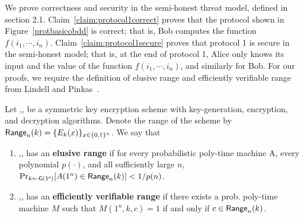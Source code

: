 We prove correctness and security in the semi-honest threat model,
defined in section 2.1.  Claim~\ref{claim:protocol1correct}
proves that the protocol shown in Figure~\ref{protbasicobdd} is
correct; that is, Bob computes the function $f(i_1,\cdots,i_n)$.
Claim~\ref{claim:protocol1secure} proves that protocol 1 is secure
in the semi-honest model; that is, at the end of protocol 1, Alice only
knows its input and the value of the function $f(i_1,\cdots,i_n)$, and
similarly for Bob. For our proofs, we require the definition of elusive range and
efficiently verifiable range from Lindell and Pinkas~\cite{LP04}.
\begin{definition}
Let ,, be a symmetric key encryption scheme
with key-generation, encryption, and decryption algorithms.
Denote the range of the scheme by
$\mathsf{Range}_n(k)=\{E_k(x)\}_{x\in\{0,1\}^n}$. We say that
\begin{enumerate}
	\item {},, has an \textbf{elusive range}
	if for every probabilistic poly-time machine A, every
	polynomial $p(\cdot)$, and all sufficiently large $n$,
	$\Pr_{k{\gets}\mathsf{G(1^n)}}[A(1^n)\in\mathsf{Range}_n(k)]<1/p(n)$.

	\item {},, has an \textbf{efficiently
	verifiable range} if there exists a prob. poly-time
	machine $M$ such that $M(1^n,k,c)=1$ if and only if
	$c\in\mathsf{Range}_n(k)$.
\end{enumerate}
\end{definition}

